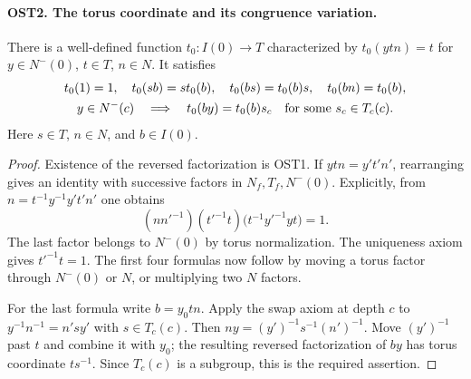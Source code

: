 \documentclass[11pt,a4paper]{article}
\numberwithin{equation}{section}
\theoremstyle{remark}\newtheorem{remark}[theorem]{Remark}
\begin{document}
\paragraph{OST2. The torus coordinate and its congruence variation.}
\label{claim:OST2}
There is a well-defined function $t_0:I(0)\to T$ characterized by
$t_0(y t n)=t$ for $y\in N^-(0)$, $t\in T$, $n\in N$.
It satisfies
\begin{gather}
 t_0(1)=1,\quad t_0(sb)=s t_0(b),\quad
 t_0(bs)=t_0(b)s,\quad t_0(bn)=t_0(b),\\
 y\in N^-(c)\quad\Longrightarrow\quad
 t_0(by)=t_0(b)s_c\quad\hbox{for some }s_c\in T_c(c).
 \label{eq:ost-torus}
\end{gather}
Here $s\in T$, $n\in N$, and $b\in I(0)$.
\begin{proof}
Existence of the reversed factorization is OST1.  If
$ytn=y't'n'$, rearranging gives an identity with successive factors
in $N_f,\allowbreak{} T_f,\allowbreak{} N^-(0)$.  Explicitly, from
$n=t^{-1}y^{-1}y't'n'$ one obtains
\[
 (nn'^{-1})(t'^{-1}t)
           \bigl(t^{-1}y'^{-1}yt\bigr)=1.
\]
The last factor belongs to $N^-(0)$ by torus normalization.
The uniqueness axiom gives $t'^{-1}t=1$.
The first four formulas now follow by moving a torus factor through
$N^-(0)$ or $N$, or multiplying two $N$ factors.

For the last formula write $b=y_0tn$.  Apply the swap axiom at
depth $c$ to $y^{-1}n^{-1}=n'sy'$ with $s\in T_c(c)$.
Then $ny=(y')^{-1}s^{-1}(n')^{-1}$.  Move $(y')^{-1}$
past $t$ and combine it with $y_0$; the resulting reversed
factorization of $by$ has torus coordinate $ts^{-1}$.
Since $T_c(c)$ is a subgroup, this is the required assertion.
\end{proof}

\end{document}
